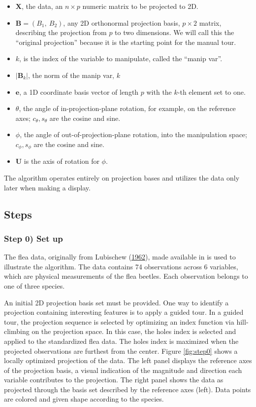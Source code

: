 \begin{itemize}
\tightlist
\item
  \(\textbf{X}\), the data, an \(n \times p\) numeric matrix to be
  projected to 2D.
\item
  \(\textbf{B} = (B_1,~ B_2)\), any 2D orthonormal projection basis,
  \(p \times 2\) matrix, describing the projection from \(p\) to two
  dimensions. We will call this the ``original projection'' because it
  is the starting point for the manual tour.
\item
  \(k\), is the index of the variable to manipulate, called the ``manip
  var''.
\item
  \(|\textbf{B}_k|\), the norm of the manip var, \(k\) 
\item
  \(\textbf{e}\), a 1D coordinate basis vector of length \(p\) with the
  \(k\)-th element set to one.
\item
  \(\theta\), the angle of in-projection-plane rotation, for example, on
  the reference axes; \(c_\theta, s_\theta\) are the cosine and sine.
\item
  \(\phi\), the angle of out-of-projection-plane rotation, into the
  manipulation space; \(c_\phi, s_\phi\) are the cosine and sine.
\item
  \(\textbf{U}\) is the axis of rotation for \(\phi\).
\end{itemize}

The algorithm operates entirely on projection bases and utilizes the
data only later when making a display.

\hypertarget{steps}{%
\subsection{Steps}\label{steps}}

\hypertarget{step-0-set-up}{%
\subsubsection{Step 0) Set up}\label{step-0-set-up}}

The flea data, originally from Lubischew
(\protect\hyperlink{ref-lubischew_use_1962}{1962}), made available in
 is used to illustrate the algorithm. The data contains 74
observations across 6 variables, which are physical measurements of the
flea beetles. Each observation belongs to one of three species.

An initial 2D projection basis set must be provided. One way to identify
a projection containing interesting features is to apply a guided tour.
In a guided tour, the projection sequence is selected by optimizing an
index function via hill-climbing on the projection space. In this case,
the holes index is selected and applied to the standardized flea data.
The holes index is maximized when the projected observations are
furthest from the center. Figure \ref{fig:step0} shows a locally
optimized projection of the data. The left panel displays the reference
axes of the projection basis, a visual indication of the magnitude and
direction each variable contributes to the projection. The right panel
shows the data as projected through the basis set described by the
reference axes (left). Data points are colored and given shape according
to the species.


